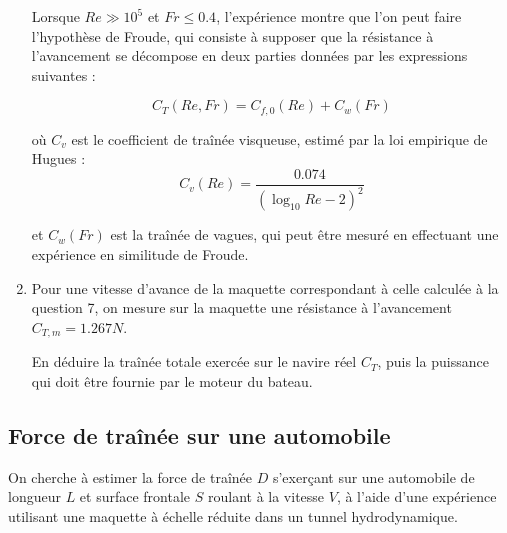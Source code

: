 \begin{enumerate}
 Lorsque $Re \gg 10^{5}$ et $Fr \le 0.4$, l'expérience montre que l'on peut faire l'hypothèse de Froude, qui consiste à supposer que la  résistance à l'avancement se décompose en deux parties données par les expressions suivantes :

$$
C_T(Re, Fr) = C_{f,0}(Re) + C_{w}(Fr) 
$$ 

où $C_v$ est le coefficient de traînée visqueuse, estimé par la loi empirique de Hugues :
$$
C_v(Re) = \frac{0.074}{\left( \log_{10} Re - 2 \right)^2}
$$

et $C_{w}(Fr)$ est la traînée de vagues, qui peut être mesuré en effectuant une expérience en similitude de Froude.

\item  Pour une vitesse d'avance de la maquette correspondant à celle calculée à la question 7, on mesure sur la maquette une résistance à l'avancement 
$C_{T,m}  = 1.267 N$. 

En déduire la traînée totale exercée sur le navire réel $C_T$, puis la puissance qui doit être fournie par le moteur du bateau.



\end{enumerate}



\subsection{Force de traînée sur une automobile}

On cherche à estimer la force de traînée $D$ s'exerçant sur une automobile de longueur $L$ et surface frontale $S$ roulant à la vitesse $V$, à l'aide d'une expérience utilisant une maquette à échelle réduite dans un tunnel hydrodynamique.

